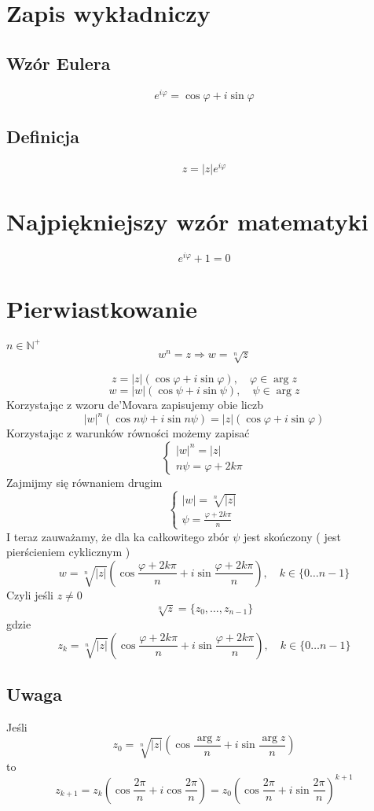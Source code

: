 \documentclass[11pt]{article}
\begin{document}
\section{Zapis wykładniczy}
\subsection{Wzór Eulera}
$$ e^{i\varphi} = \cos{\varphi} + i\sin{\varphi} $$
\subsection{Definicja}
$$ z = |z|e^{i\varphi} $$
\section{Najpiękniejszy wzór matematyki}
$$ e^{i\varphi} + 1 = 0 $$
\section{Pierwiastkowanie}
$ n \in \mathbb{N}^+ $ $$ w^n = z \Longrightarrow w = \sqrt[n]{z} $$

$$ z = |z| ( \cos{\varphi} + i \sin{\varphi} ) , \quad \varphi \in \arg{z} $$
$$ w = |w| ( \cos{\psi} + i \sin{\psi} ), \quad \psi \in \arg{z}$$
Korzystając z wzoru de'Movara zapisujemy obie liczb
$$ |w|^n(\cos{n\psi} + i\sin{n\psi} ) = |z| ( \cos{\varphi} + i\sin{\varphi}) $$
Korzystając z warunków równości możemy zapisać
$$ \begin{cases} |w|^n = |z| \\ n\psi = \varphi + 2k\pi\end{cases}$$
Zajmijmy się równaniem drugim
$$ \begin{cases} |w| = \sqrt[n]{|z|} \\ \psi = \frac{\varphi + 2k\pi}{n} \end{cases}$$
I teraz zauważamy, że dla ka całkowitego zbór $\psi$ jest skończony ( jest pierścieniem cyklicznym )
$$ w = \sqrt[n]{|z|}\left(\cos{\frac{\varphi + 2k\pi}{n}} + i \sin{\frac{\varphi +2k\pi}{n}}\right), \quad k \in \{0 \ldots n-1\}$$
Czyli jeśli $z \not = 0$
$$ \sqrt[n]{z} = \{z_0,\ldots,z_{n-1}\} $$ gdzie
$$ z_k = \sqrt[n]{|z|}\left(\cos{\frac{\varphi + 2k\pi}{n}} + i \sin{\frac{\varphi +2k\pi}{n}}\right), \quad k \in \{0 \ldots n-1\}$$
\subsection{Uwaga}
Jeśli
$$ z_0 = \sqrt[n]{|z|}\left(\cos{\frac{\arg{z}}{n}} + i \sin{\frac{\arg{z}}{n}}\right)$$
to
$$ z_{k+1} = z_k(\cos{\frac{2\pi}{n}} + i \cos{\frac{2\pi}{n}})= 
z_0\left(\cos{\frac{2\pi}{n}} + i\sin{\frac{2\pi}{n}}\right)^{k+1}$$
\end{document}
